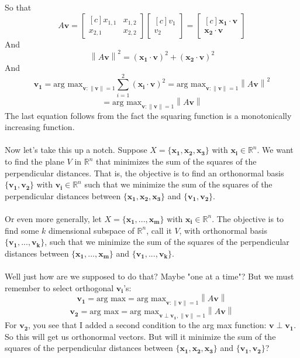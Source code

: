 \documentclass{tufte-handout}
\newcommand{\norm}[1]{\left\lVert#1\right\rVert}
\begin{document}
So that
\[
A\mathbf{v}=
\begin{bmatrix*}[c]
x_{1,1}&x_{1,2}\\
x_{2,1}&x_{2,2}
\end{bmatrix*}
\begin{bmatrix*}[c]
v_1\\v_2
\end{bmatrix*}
=
\begin{bmatrix*}[c]
\mathbf{x_1}\cdot\mathbf{v}\\\mathbf{x_2}\cdot\mathbf{v}
\end{bmatrix*}
\]
And
\[
\norm{A\mathbf{v}}^2=
(\mathbf{x_1}\cdot\mathbf{v})^2
+(\mathbf{x_2}\cdot\mathbf{v})^2
\]
And
\[
\mathbf{v_1}=\text{arg max}
_{\mathbf{v}:\norm{\mathbf{v}}=1}\sum_{i=1}^{2}(\mathbf{x_i}\cdot\mathbf{v})^2
=
\text{arg max}_{\mathbf{v}:\norm{\mathbf{v}}=1}\norm{A\mathbf{v}}^2
\]
\[
=
\text{arg max}_{\mathbf{v}:\norm{\mathbf{v}}=1}\norm{A\mathbf{v}}
\]
The last equation follows from the fact the squaring function is a monotonically increasing function.\\\leavevmode\\

\noindent Now let's take this up a notch. Suppose $X=\{\mathbf{x_1},\mathbf{x_2}, \mathbf{x_3}\}$ with $\mathbf{x_i}\in\mathbb{R}^n$. We want to find the plane $V$ in $\mathbb{R}^n$ that minimizes the sum of the squares of the perpendicular distances. That is, the objective is to find an orthonormal basis $\{\mathbf{v_1},\mathbf{v_2}\}$ with $\mathbf{v_i}\in\mathbb{R}^n$ such that we minimize the sum of the squares of the perpendicular distances between $\{\mathbf{x_1},\mathbf{x_2}, \mathbf{x_3}\}$ and $\{\mathbf{v_1}, \mathbf{v_2}\}$.\\\leavevmode\\


\noindent Or even more generally, let $X=\{\mathbf{x_1},...,\mathbf{x_m}\}$ with $\mathbf{x_i}\in\mathbb{R}^n$. The objective is to find some $k$ dimensional subspace of $\mathbb{R}^n$, call it $V$, with orthonormal basis $\{\mathbf{v_1},...,\mathbf{v_k}\}$, such that we minimize the sum of the squares of the perpendicular distances between $\{\mathbf{x_1},...,\mathbf{x_m}\}$ and $\{\mathbf{v_1},...,\mathbf{v_k}\}$.\\\leavevmode\\

\noindent Well just how are we supposed to do that? Maybe "one at a time"? But we must remember to select orthogonal $\mathbf{v_i}$'s:
\[
\mathbf{v_1}=\text{arg max}
=
\text{arg max}_{\mathbf{v}:\norm{\mathbf{v}}=1}\norm{A\mathbf{v}}
\]
\[
\mathbf{v_2}=\text{arg max}
=
\text{arg max}_{\mathbf{v}\perp\mathbf{v_1},\norm{\mathbf{v}}=1}\norm{A\mathbf{v}}
\]
For $\mathbf{v_2}$, you see that I added a second condition to the arg max function: $\mathbf{v}\perp\mathbf{v_1}$. So this will get us orthonormal vectors. But will it minimize the sum of the squares of the perpendicular distances between $\{\mathbf{x_1},\mathbf{x_2}, \mathbf{x_3}\}$ and $\{\mathbf{v_1}, \mathbf{v_2}\}$?\\\leavevmode\\
\end{document}
